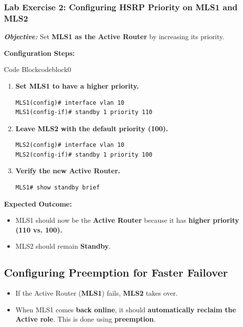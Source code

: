 \documentclass[a4paper]{book}
\begin{document}
\subsubsection{Lab Exercise 2: Configuring HSRP Priority on MLS1 and MLS2}
\textbf{\textit{Objective:}} Set \textbf{MLS1 as the Active Router} by increasing its priority.
\vspace{1.5em}
\vspace{1.5em}

\textbf{Configuration Steps:}


\vspace{1.5em}


\begin{ocg}{Code Block}{codeblock}{0}


\vspace{0.5cm}
\begin{enumerate}
\item \textbf{Set MLS1 to have a higher priority.}
\begin{lstlisting}
MLS1(config)# interface vlan 10
MLS1(config-if)# standby 1 priority 110
\end{lstlisting}

\item \textbf{Leave MLS2 with the default priority (100).}
\begin{lstlisting}
MLS2(config)# interface vlan 10
MLS2(config-if)# standby 1 priority 100
\end{lstlisting}

\item \textbf{Verify the new Active Router.}
\begin{lstlisting}
MLS1# show standby brief
\end{lstlisting}
\end{enumerate}
\end{ocg}




\textbf{Expected Outcome:}
\begin{itemize}
\item MLS1 should now be the \textbf{Active Router} because it has 
\textbf{higher priority (110 vs. 100).}
\item MLS2 should remain \textbf{Standby}.
\end{itemize}

\subsection{Configuring Preemption for Faster Failover}
\begin{itemize}
\item If the Active Router (\textbf{MLS1}) fails, \textbf{MLS2} takes over.
\item When MLS1 comes \textbf{back online}, it should \textbf{automatically reclaim the Active role}. 
This is done using \textbf{preemption}.
\end{itemize}
\end{document}
